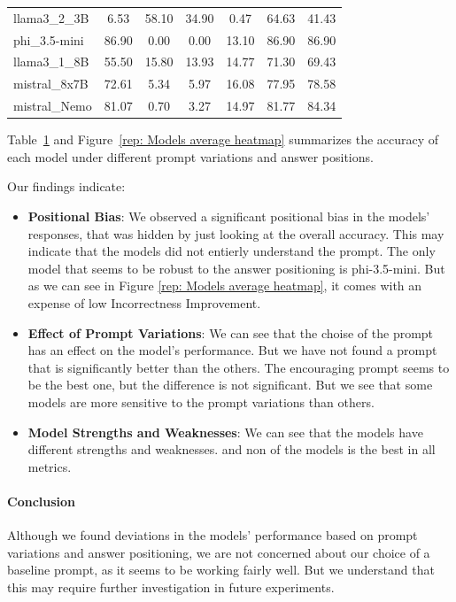 \begin{table}[htbp]
\begin{tabular}{@{}lcccccc@{}}
    llama3\_2\_3B  & 6.53  & 58.10 & 34.90 & 0.47  & 64.63        & 41.43       \\
    phi\_3.5-mini  & 86.90 & 0.00  & 0.00  & 13.10 & 86.90        & 86.90       \\
    llama3\_1\_8B  & 55.50 & 15.80 & 13.93 & 14.77 & 71.30        & 69.43       \\
    mistral\_8x7B  & 72.61 & 5.34  & 5.97  & 16.08 & 77.95        & 78.58       \\
    mistral\_Nemo  & 81.07 & 0.70  & 3.27  & 14.97 & 81.77        & 84.34       \\ \bottomrule
  \end{tabular}
  \label{tab:combined_results}
\end{table}

Table~\ref{tab:combined_results} and Figure~\ref{rep: Models average heatmap} summarizes the accuracy of each model under different prompt variations and answer positions.

Our findings indicate:

\begin{itemize}
  \item \textbf{Positional Bias}: We observed a significant positional bias in the models' responses, that was hidden by just looking at the overall accuracy. This may indicate that the models did not entierly understand the prompt. The only model that seems to be robust to the answer positioning is phi-3.5-mini. But as we can see in Figure \ref{rep: Models average heatmap}, it comes with an expense of low Incorrectness Improvement.
  \item \textbf{Effect of Prompt Variations}: We can see that the choise of the prompt has an effect on the model's performance. But we have not found a prompt that is significantly better than the others. The encouraging prompt seems to be the best one, but the difference is not significant. But we see that some models are more sensitive to the prompt variations than others.
  \item \textbf{Model Strengths and Weaknesses}: We can see that the models have different strengths and weaknesses. and non of the models is the best in all metrics.
\end{itemize}

\paragraph{Conclusion}

Although we found deviations in the models' performance based on prompt variations and answer positioning, we are not concerned about our choice of a baseline prompt, as it seems to be working fairly well. But we understand that this may require further investigation in future experiments.

